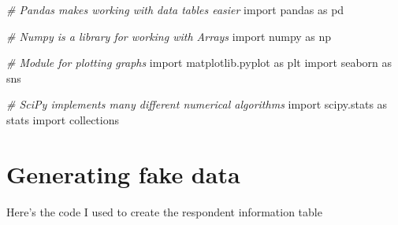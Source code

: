 \documentclass[]{book}
\newenvironment{Shaded}{\begin{snugshade}}{\end{snugshade}}
\newcommand{\CommentTok}[1]{\textcolor[rgb]{0.56,0.35,0.01}{\textit{#1}}}
\newcommand{\NormalTok}[1]{#1}
\begin{document}
\begin{Shaded}
\begin{Highlighting}[]
\CommentTok{# Pandas makes working with data tables easier}
\NormalTok{import pandas as pd}

\CommentTok{# Numpy is a library for working with Arrays}
\NormalTok{import numpy as np}

\CommentTok{# Module for plotting graphs}
\NormalTok{import matplotlib.pyplot as plt}
\NormalTok{import seaborn as sns}

\CommentTok{# SciPy implements many different numerical algorithms}
\NormalTok{import scipy.stats as stats}
\NormalTok{import collections}
\end{Highlighting}
\end{Shaded}

\hypertarget{appendixC}{%
\chapter{Generating fake data}\label{appendixC}}

Here's the code I used to create the respondent information table
\end{document}
